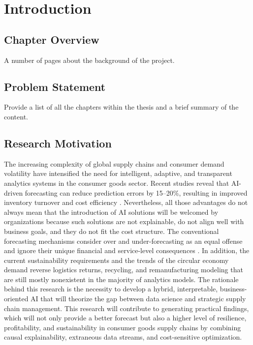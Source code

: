 \chapter{Introduction}
 \setcounter{page}{1}

\section{Chapter Overview}

A number of pages about the background of the project.


\section{Problem Statement}

Provide a list of all the chapters within the thesis and a brief summary of the content.


\section{Research Motivation}

The increasing complexity of global supply chains and consumer demand volatility have intensified the need for intelligent, adaptive, and transparent analytics systems in the consumer goods sector. Recent studies reveal that AI-driven forecasting can reduce prediction errors by 15–20\%, resulting in improved inventory turnover and cost efficiency \autocite{khedr_enhancing_2024}. Nevertheless, all those advantages do not always mean that the introduction of AI solutions will be welcomed by organizations because such solutions are not explainable, do not align well with business goals, and they do not fit the cost structure. The conventional forecasting mechanisms consider over and under-forecasting as an equal offense and ignore their unique financial and service-level consequences \autocite{ledro_artificial_2025}. In addition, the current sustainability requirements and the trends of the circular economy demand reverse logistics returns, recycling, and remanufacturing modeling that are still mostly nonexistent in the majority of analytics models. The rationale behind this research is the necessity to develop a hybrid, interpretable, business-oriented AI that will theorize the gap between data science and strategic supply chain management. This research will contribute to generating practical findings, which will not only provide a better forecast but also a higher level of resilience, profitability, and sustainability in consumer goods supply chains by combining causal explainability, extraneous data streams, and cost-sensitive optimization.

